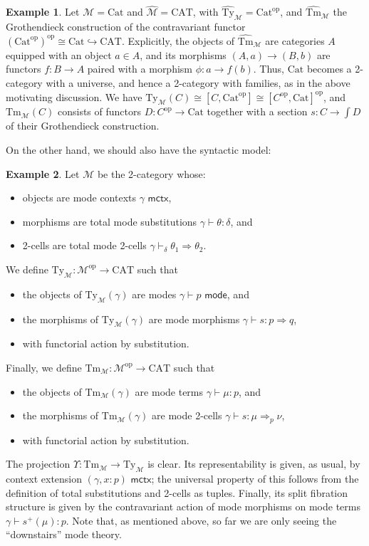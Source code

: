 \documentclass[10pt]{article}
\theoremstyle{definition}
\newtheorem{example}{Example}
\newcommand{\yields}{\vdash}
\newcommand{\tcell}{\Rightarrow}
\newcommand{\ctx}{\,\,\mathsf{mctx}}
\newcommand{\type}{\,\,\mathsf{mode}}
\newcommand\TypeTwo[4]{\ensuremath{#1 \vdash #2 :  #3 \tcell #4}}
\newcommand\TermTwoT[5]{\ensuremath{#1 \vdash {#2} : #3 \tcell_{#5} #4}}
\newcommand\TrPlus[2]{\ensuremath{{#1}^+(#2)}}
\newcommand\op{^{\mathrm{op}}}
\newcommand\Cat{\mathrm{Cat}}
\newcommand\CAT{\mathrm{CAT}}
\newcommand\M{\mathcal{M}}
\newcommand\Mhat{\widehat{\mathcal{M}}}
\newcommand\Mty{{\mathrm{Ty}_{\M}}}
\newcommand\Mtm{{\mathrm{Tm}_{\M}}}
\newcommand\Mtyhat{{\widehat{\mathrm{Ty}}_{\M}}}
\newcommand\Mtmhat{{\widehat{\mathrm{Tm}}_{\M}}}
\newcommand\Ups{\Upsilon}
\begin{document}
\begin{example}\label{eg:cat-2cwf}
  Let $\M=\Cat$ and $\Mhat=\CAT$, with $\Mtyhat = \Cat\op$, and $\Mtmhat$ the Grothendieck construction of the contravariant functor $(\Cat\op)\op \cong \Cat \hookrightarrow \CAT$.
  Explicitly, the objects of $\Mtmhat$ are categories $A$ equipped with an object $a\in A$, and its morphisms $(A,a) \to (B,b)$ are functors $f:B\to A$ paired with a morphism $\phi : a\to f(b)$.
  Thus, $\Cat$ becomes a 2-category with a universe, and hence a 2-category with families, as in the above motivating discussion.
  We have $\Mty(C) \cong [C,\Cat\op] \cong [C\op,\Cat]\op$, and $\Mtm(C)$ consists of functors $D:C\op\to\Cat$ together with a section $s:C\to \int D$ of their Grothendieck construction.
\end{example}

On the other hand, we should also have the syntactic model:

\begin{example}\label{eg:syn-2cwf}
  Let $\M$ be the 2-category whose:
  \begin{itemize}
  \item objects are mode contexts $\gamma \ctx$,
  \item morphisms are total mode substitutions $\gamma \yields \theta : \delta$, and
  \item 2-cells are total mode 2-cells $\gamma \yields_\delta \theta_1 \tcell \theta_2$.
  \end{itemize}
  We define $\Mty:\M\op\to\CAT$ such that
  \begin{itemize}
  \item the objects of $\Mty(\gamma)$ are modes $\gamma \yields p\type$, and
  \item the morphisms of $\Mty(\gamma)$ are mode morphisms $\TypeTwo{\gamma}{s}{p}{q}$,
  \item with functorial action by substitution.
  \end{itemize}
  Finally, we define $\Mtm:\M\op\to\CAT$ such that
  \begin{itemize}
  \item the objects of $\Mtm(\gamma)$ are mode terms $\gamma \yields \mu:p$, and
  \item the morphisms of $\Mtm(\gamma)$ are mode 2-cells $\TermTwoT{\gamma}{s}{\mu}{\nu}{p}$,
  \item with functorial action by substitution.
  \end{itemize}
  The projection $\Ups:\Mtm\to\Mty$ is clear.
  Its representability is given, as usual, by context extension $(\gamma, x:p) \ctx$; the universal property of this follows from the definition of total substitutions and 2-cells as tuples.
  Finally, its split fibration structure is given by the contravariant action of mode morphisms on mode terms ${\gamma \yields \TrPlus{s}{\mu} : p}$.
  Note that, as mentioned above, so far we are only seeing the ``downstairs'' mode theory.
\end{example}
\end{document}
